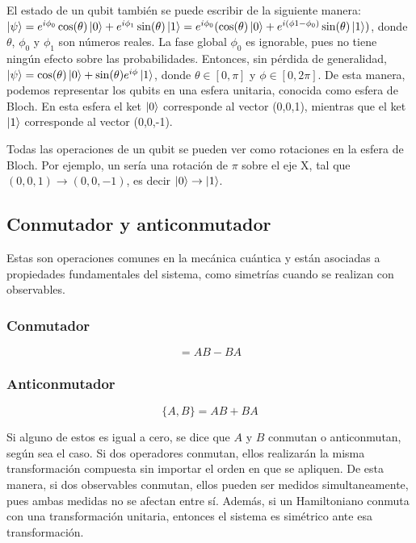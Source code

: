 El estado de un qubit también se puede escribir de la siguiente manera: $ \ket{\psi} = e^{i \phi_0} \cos ( \theta ) \ket{0} + e^{i \phi_1} \sin ( \theta ) \ket{1}  = e^{i \phi_0} (\cos ( \theta ) \ket{0} + e^{i ( \phi1 - \phi_0 )} \sin ( \theta ) \ket{1}) $, donde $ \theta $, $\phi_0$ y $\phi_1$ son números reales. La fase global $\phi_0$ es ignorable, pues no tiene ningún efecto sobre las probabilidades. Entonces, sin pérdida de generalidad, $ \ket{\psi} = \cos ( \theta ) \ket{0} + \sin ( \theta ) e^{i \phi} \ket{1} $, donde $ \theta \in [0, \pi ] $ y $ \phi \in [0, 2 \pi ] $. De esta manera, podemos representar los qubits en una esfera unitaria, conocida como esfera de Bloch. En esta esfera el ket $\ket{0}$ corresponde al vector (0,0,1), mientras que el ket $\ket{1}$ corresponde al vector (0,0,-1).

Todas las operaciones de un qubit se pueden ver como rotaciones en la esfera de Bloch. Por ejemplo, un  sería una rotación de $\pi$ sobre el eje X, tal que $(0,0,1) \rightarrow (0,0,-1)$, es decir $\ket{0} \rightarrow \ket{1}$.

\subsection{Conmutador y anticonmutador}

Estas son operaciones comunes en la mecánica cuántica y están asociadas a propiedades fundamentales del sistema, como simetrías cuando se realizan con observables.

\subsubsection{Conmutador}

\begin{equation}
    [A,B] = A B - B A
\end{equation}

\subsubsection{Anticonmutador}

\begin{equation}
    \{A,B\} = A B + B A
\end{equation}

Si alguno de estos es igual a cero, se dice que $A$ y $B$ conmutan o anticonmutan, según sea el caso. Si dos operadores conmutan, ellos realizarán la misma transformación compuesta sin importar el orden en que se apliquen. De esta manera, si dos observables conmutan, ellos pueden ser medidos simultaneamente, pues ambas medidas no se afectan entre sí. Además, si un Hamiltoniano conmuta con una transformación unitaria, entonces el sistema es simétrico ante esa transformación.


